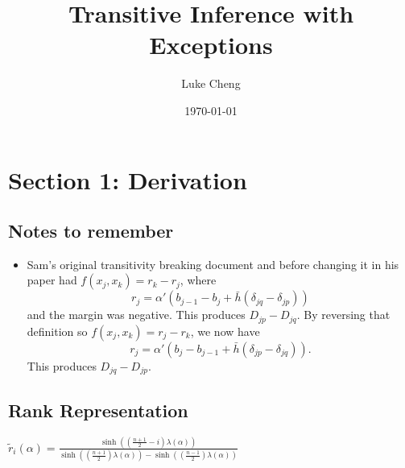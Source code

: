 \documentclass[a4paper, 12pt]{article}
\title{Transitive Inference with Exceptions}
\author{Luke Cheng}
\date{\today}
\begin{document}
\maketitle

\tableofcontents
\newpage

\section{Section 1: Derivation}

\subsection*{Notes to remember}
\begin{itemize}
    \item Sam's original transitivity breaking document and before changing it in his paper had $f(x_j, x_k) = r_k - r_j$, where $$r_j = \alpha' (b_{j-1} - b_j + \bar{h}(\delta_{jq} - \delta_{jp})) $$ and the margin was negative.  This produces $D_{jp} - D_{jq}$. By reversing that definition so $f(x_j, x_k) = r_j - r_k$, we now have $$r_j = \alpha' (b_{j} - b_{j-1} + \bar{h}(\delta_{jp} - \delta_{jq})). $$ This produces $D_{jq} - D_{jp}$. 
\end{itemize}

\subsection*{Rank Representation}

$\tilde{r}_i(\alpha) = \frac{\sinh\left( \left( \frac{n+1}{2} - i \right) \lambda(\alpha) \right)}{\sinh\left( \left( \frac{n+1}{2} \right) \lambda(\alpha) \right) - \sinh\left( \left( \frac{n-1}{2} \right) \lambda(\alpha) \right)}$
\end{document}
